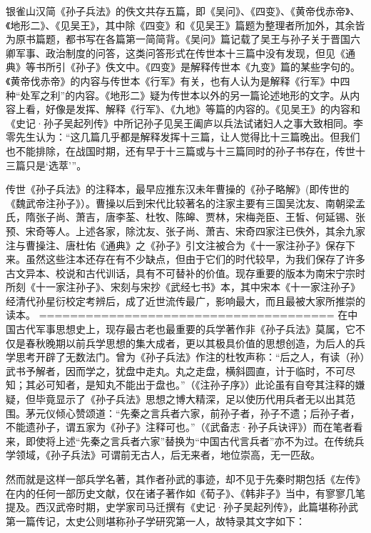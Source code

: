 \documentclass[12pt,UTF8]{ctexbook}
\begin{document}
银雀山汉简《孙子兵法》的佚文共存五篇，即《吴问》、《四变》、《黄帝伐赤帝》、《地形二》、《见吴王》，其中除《四变》和《见吴王》篇题为整理者所加外，其余皆为原书篇题，都书写在各篇第一简简背。《吴问》篇记载了吴王与孙子关于晋国六卿军事、政治制度的问答，这类问答形式在传世本十三篇中没有发现，但见《通典》等书所引《孙子》佚文中。《四变》是解释传世本《九变》篇的某些字句的。《黄帝伐赤帝》的内容与传世本《行军》有关，也有人认为是解释《行军》中四种“处军之利”的内容。《地形二》疑为传世本以外的另一篇论述地形的文字。从内容上看，好像是发挥、解释《行军》、《九地》等篇的内容的。《见吴王》的内容和《史记·孙子吴起列传》中所记孙子见吴王阖庐以兵法试诸妇人之事大致相同。李零先生认为：“这几篇几乎都是解释发挥十三篇，让人觉得比十三篇晚出。但我们也不能排除，在战国时期，还有早于十三篇或与十三篇同时的孙子书存在，传世十三篇只是‘选萃’”。

传世《孙子兵法》的注释本，最早应推东汉未年曹操的《孙子略解》(即传世的《魏武帝注孙子》）。曹操以后到宋代比较著名的注家主要有三国吴沈友、南朝梁孟氏，隋张子尚、萧吉，唐李荃、杜牧、陈皞、贾林，宋梅尧臣、王皙、何延锡、张预、宋奇等人。上述各家，除沈友、张子尚、萧吉、宋奇四家注已佚外，其余九家注与曹操注、唐杜佑《通典》之《孙子》引文注被合为《十一家注孙子》保存下来。虽然这些注本还存在有不少缺点，但由于它们的时代较早，为我们保存了许多古文异本、校说和古代训话，具有不可替补的价值。现存重要的版本为南宋宁宗时所刻《十一家注孙子》、宋刻与宋抄《武经七书》本，其中宋本《十一家注孙子》经清代孙星衍校定考辨后，成了近世流传最广，影响最大，而且最被大家所推崇的读本。
======================================
在中国古代军事思想史上，现存最古老也最重要的兵学著作非《孙子兵法》莫属，它不仅是春秋晚期以前兵学思想的集大成者，更以其极具价值的思想创造，为后人的兵学思考开辟了无数法门。曾为《孙子兵法》作注的杜牧声称：“后之人，有读（孙）武书予解者，因而学之，犹盘中走丸。丸之走盘，横斜圆直，计于临时，不可尽知；其必可知者，是知丸不能出于盘也。”（《注孙子序》）此论虽有自夸其注释的嫌疑，但毕竟显示了《孙子兵法》思想之博大精深，足以使历代用兵者无以出其范围。茅元仪倾心赞颂道：“先秦之言兵者六家，前孙子者，孙子不遗；后孙子者，不能遗孙子，谓五家为《孙子》注释可也。”（《武备志·孙子兵诀评》）而在笔者看来，即使将上述“先秦之言兵者六家”替换为“中国古代言兵者”亦不为过。在传统兵学领域，《孙子兵法》可谓前无古人，后无来者，地位崇高，无一匹敌。

然而就是这样一部兵学名著，其作者孙武的事迹，却不见于先秦时期包括《左传》在内的任何一部历史文献，仅在诸子著作如《荀子》、《韩非子》当中，有寥寥几笔提及。西汉武帝时期，史学家司马迁撰有《史记·孙子吴起列传》，此篇堪称孙武第一篇传记，太史公则堪称孙子学研究第一人，故特录其文字如下：
\end{document}
